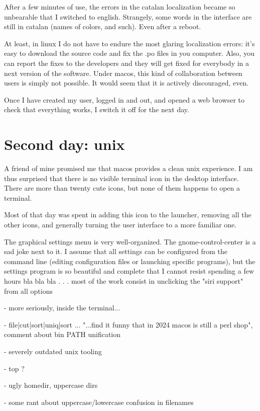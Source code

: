 After a few minutes of use, the errors in the catalan localization became so
unbearable that I switched to english.  Strangely, some words in the
interface are still in catalan (names of colors, and such).  Even after a
reboot.

At least, in linux I do not have to endure the most glaring localization
errors: it's easy to download the source code and fix the .po files in you
computer.  Also, you can report the fixes to the developers and they will get
fixed for everybody in a next version of the software.  Under macos, this
kind of collaboration between users is simply not possible.
It would seem that it is actively discouraged, even.

Once I have created my user, logged in and out, and opened a web browser to
check that everything works, I switch it off for the next day.


\section*{Second day: unix}

A friend of mine promised me that macos provides a clean unix experience.  I
am thus surprised that there is no visible terminal icon in the desktop
interface.  There are more than twenty cute icons, but none of them happens
to open a terminal.

Most of that day was spent in adding this icon to the launcher,
removing all the other icons, and generally turning the user interface to a
more familiar one.

The graphical settings menu is very well-organized.  The gnome-control-center
is a sad joke next to it.   I assume that all settings can be configured from
the command line (editing configuration files or launching specific
programs), but the settings program is so beautiful and complete that I
cannot resist spending a few hours  bla bla bla . . . most of the work
consist in unclicking the "siri support" from all options

- more seriously, inside the terminal...

- file|cut|sort|uniq|sort ... "...find it funny that in 2024 macos is still a
perl shop", comment about bin PATH unification

- severely outdated unix tooling

- top ?

- ugly homedir, uppercase dirs

- some rant about uppercase/lowercase confusion in filenames


